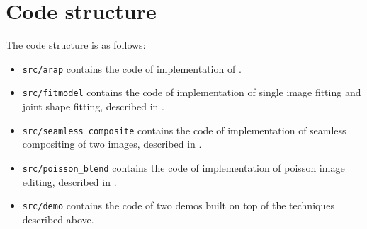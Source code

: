 \section{Code structure}
The code structure is as follows:
\begin{itemize}
\item \texttt{src/arap} contains the code of implementation of \cite{igarashi2005rigid}.
\item \texttt{src/fitmodel} contains the code of implementation of single image fitting and joint shape fitting, described in \cite{yang2011expression}.
\item \texttt{src/seamless\_composite} contains the code of implementation of seamless compositing of two images, described in \cite{agarwala2004interactive}.
\item \texttt{src/poisson\_blend} contains the code of implementation of poisson image editing, described in \cite{perez2003poisson}.
\item \texttt{src/demo} contains the code of two demos built on top of the techniques described above.
\end{itemize}